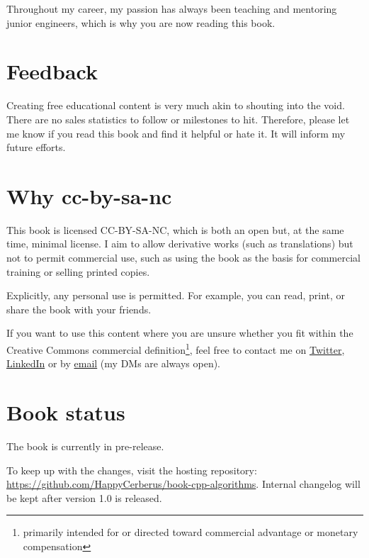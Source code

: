 Throughout my career, my passion has always been teaching and mentoring junior engineers, which is why you are now reading this book.

\section*{Feedback}

Creating free educational content is very much akin to shouting into the void. There are no sales statistics to follow or milestones to hit. Therefore, please let me know if you read this book and find it helpful or hate it. It will inform my future efforts.

\section*{Why cc-by-sa-nc}

This book is licensed CC-BY-SA-NC, which is both an open but, at the same time, minimal license. I aim to allow derivative works (such as translations) but not to permit commercial use, such as using the book as the basis for commercial training or selling printed copies.

Explicitly, any personal use is permitted. For example, you can read, print, or share the book with your friends.

If you want to use this content where you are unsure whether you fit within the Creative Commons commercial definition\footnote{primarily intended for or directed toward commercial advantage or monetary compensation}, feel free to contact me on \href{https://twitter.com/SimonToth83}{Twitter}, \href{https://cz.linkedin.com/in/simontoth}{LinkedIn} or by \href{mailto:business@simontoth.eu}{email} (my DMs are always open).

\section*{Book status}

The book is currently in pre-release.

To keep up with the changes, visit the hosting repository: \url{https://github.com/HappyCerberus/book-cpp-algorithms}. Internal changelog will be kept after version 1.0 is released.